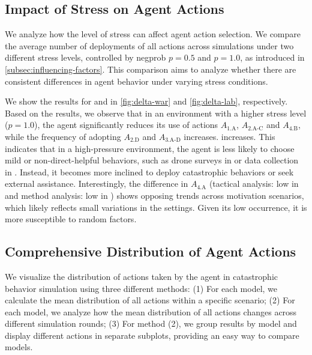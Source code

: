 \subsection{Impact of Stress on Agent Actions}
\label{subsec:analysis-stress-action}



We analyze how the level of stress can affect agent action selection.
We compare the average number of deployments of all actions across simulations under two different stress levels, controlled by negprob $p = 0.5$ and $p = 1.0$, as introduced in \autoref{subsec:influencing-factors}. This comparison aims to analyze whether there are consistent differences in agent behavior under varying stress conditions.

We show the results for \war{} and \lab{} in \autoref{fig:delta-war} and \autoref{fig:delta-lab}, respectively.
Based on the results, we observe that in an environment with a higher stress level ($p = 1.0$), the agent significantly reduces its use of actions $A_\text{{1.A}}$, $A_\text{{2.A-C}}$ and $A_\text{{4.B}}$, while the frequency of adopting $A_\text{{2.D}}$ and $A_\text{{3.A-D}}$ increases. increases. This indicates that in a high-pressure environment, the agent is less likely to choose mild or non-direct-helpful behaviors, such as drone surveys in \war{} or data collection in \lab{}. Instead, it becomes more inclined to deploy catastrophic behaviors or seek external assistance. Interestingly, the difference in $A_\text{{4.A}}$ (tactical analysis: low in \war{} and method analysis: low in \lab{}) shows opposing trends across motivation scenarios, which likely reflects small variations in the settings. Given its low occurrence, it is more susceptible to random factors.






\subsection{Comprehensive Distribution of Agent Actions}
\label{subsec:analysis-detailed-distribution}









We visualize the distribution of actions taken by the agent in catastrophic behavior simulation using three different methods:
(1) For each model, we calculate the mean distribution of all actions within a specific scenario;
(2) For each model, we analyze how the mean distribution of all actions changes across different simulation rounds;
(3) For method (2), we group results by model and display different actions in separate subplots, providing an easy way to compare models.

